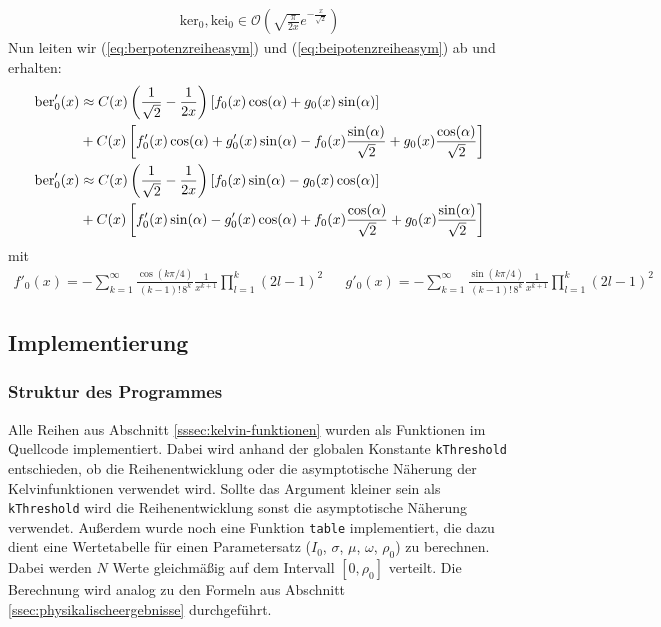 \documentclass[10pt,a4paper]{article}
\begin{document}
\begin{align}
	\mathrm{ker}_0, \mathrm{kei}_0 \in \mathcal{O}\left( \sqrt{\frac{\pi}{2 x}}e^{-\frac{x}{\sqrt{2}}} \right)
\end{align}
Nun leiten wir (\ref{eq:berpotenzreiheasym}) und (\ref{eq:beipotenzreiheasym}) ab und erhalten:
\begin{align}
	\mathrm{ber}'_0(x) &\approx C(x) \left( \frac{1}{\sqrt{2}} - \frac{1}{2x} \right) \left[f_0(x) \cos(\alpha) + g_0(x) \sin(\alpha) \right] \notag\\ & + C(x) \left[ f'_0(x) \cos(\alpha) + g'_0(x) \sin(\alpha) - f_0(x) \frac{\sin(\alpha)}{\sqrt{2}} + g_0(x) \frac{\cos(\alpha)}{\sqrt{2}} \right]\label{eq:dberpotenzreiheasym}\\
	\mathrm{ber}'_0(x) &\approx C(x) \left( \frac{1}{\sqrt{2}} - \frac{1}{2x} \right) \left[f_0(x) \sin(\alpha) - g_0(x) \cos(\alpha) \right] \notag\\ & + C(x) \left[ f'_0(x) \sin(\alpha) - g'_0(x) \cos(\alpha) + f_0(x) \frac{\cos(\alpha)}{\sqrt{2}} + g_0(x) \frac{\sin(\alpha)}{\sqrt{2}} \right] \label{eq:dbeipotenzreiheasym}
\end{align}
mit
\begin{align}
	f'_0(x) = - \sum^{\infty}_{k=1} \frac{\cos(k \pi / 4)}{(k-1)! \, 8^k} \frac{1}{x^{k+1}} \prod^{k}_{l=1}(2l - 1)^2&&
	g'_0(x) = -\sum^{\infty}_{k=1} \frac{\sin(k \pi / 4)}{(k-1)! \, 8^k} \frac{1}{x^{k+1}} \prod^{k}_{l=1}(2l - 1)^2\label{eq:d_f0g0}
\end{align}

\subsection{Implementierung}

\subsubsection{Struktur des Programmes}
Alle Reihen aus Abschnitt \ref{sssec:kelvin-funktionen} wurden als Funktionen im Quellcode implementiert.
Dabei wird anhand der globalen Konstante \texttt{kThreshold} entschieden, ob die Reihenentwicklung oder die asymptotische Näherung der Kelvinfunktionen verwendet wird.
Sollte das Argument kleiner sein als \texttt{kThreshold} wird die Reihenentwicklung sonst die asymptotische Näherung verwendet.
Außerdem wurde noch eine Funktion \texttt{table} implementiert, die dazu dient eine Wertetabelle für einen Parametersatz ($I_0$, $\sigma$, $\mu$, $\omega$, $\rho_0$) zu berechnen.
Dabei werden $N$ Werte gleichmäßig auf dem Intervall $[0,\rho_0]$ verteilt. Die Berechnung wird analog zu den Formeln aus Abschnitt \ref{ssec:physikalischeergebnisse} durchgeführt.
\end{document}
